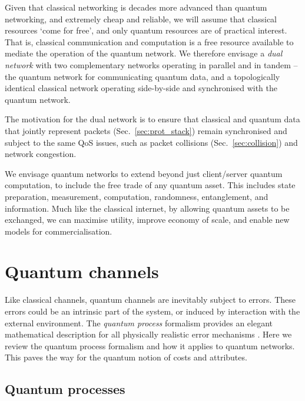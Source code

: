 \documentclass[aps, rmp, twocolumn, amsmath, amssymb, nofootinbib, superscriptaddress, longbibliography, floatfix, table-of-contents, eqsecnum]{revtex4-1}
\begin{document}
Given that classical networking is decades more advanced than quantum networking, and extremely cheap and reliable, we will assume that classical resources `come for free', and only quantum resources are of practical interest. That is, classical communication and computation is a free resource available to mediate the operation of the quantum network. We therefore envisage a \textit{dual network} with two complementary networks operating in parallel and in tandem -- the quantum network for communicating quantum data, and a topologically identical classical network operating side-by-side and synchronised with the quantum network.

The motivation for the dual network is to ensure that classical and quantum data that jointly represent packets (Sec.~\ref{sec:prot_stack}) remain synchronised and subject to the same QoS issues, such as packet collisions (Sec.~\ref{sec:collision}) and network congestion.

We envisage quantum networks to extend beyond just client/server quantum computation, to include the free trade of any quantum asset. This includes state preparation, measurement, computation, randomness, entanglement, and information. Much like the classical internet, by allowing quantum assets to be exchanged, we can maximise utility, improve economy of scale, and enable new models for commercialisation.

%
%

\section{Quantum channels} \label{sec:quant_chan} 

Like classical channels, quantum channels are inevitably subject to errors. These errors could be an intrinsic part of the system, or induced by interaction with the external environment. The \textit{quantum process} formalism provides an elegant mathematical description for all physically realistic error mechanisms \cite{bib:NielsenChuang00, bib:Gilchrist05}. Here we review the quantum process formalism and how it applies to quantum networks. This paves the way for the quantum notion of costs and attributes.

%
%

\subsection{Quantum processes} 
\end{document}
